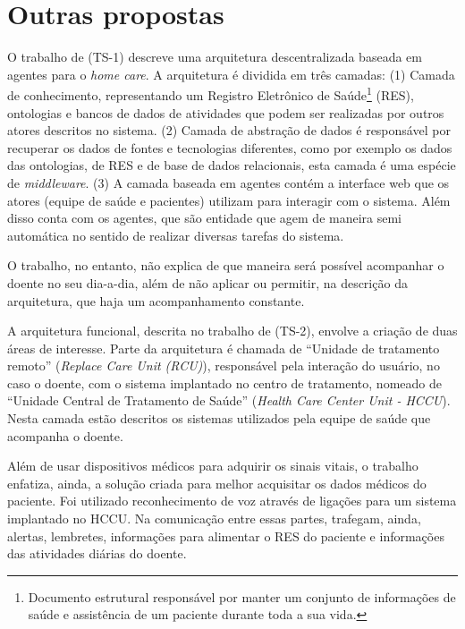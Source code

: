 \section{Outras propostas} \label{sec:solucoes-semelhantes}

O trabalho de  (TS-1) descreve uma arquitetura
descentralizada baseada em agentes para o \textit{home care}. A arquitetura é
dividida em três camadas: (1) Camada de conhecimento, representando um Registro
Eletrônico de Saúde\footnote{Documento estrutural responsável por 
manter um conjunto de informações de saúde e assistência de um paciente durante 
toda a sua vida.} (RES), ontologias e bancos de dados de atividades que podem
ser realizadas por outros atores descritos no sistema. (2) Camada de abstração
de dados é responsável por recuperar os dados de fontes e tecnologias
diferentes, como por exemplo os dados das ontologias, de RES e de base de dados
relacionais, esta camada é uma espécie de \textit{middleware}. (3) A camada
baseada em agentes contém a interface web que os atores (equipe de saúde e
pacientes) utilizam para interagir com o sistema. Além disso conta com os
agentes, que são entidade que agem de maneira semi automática no sentido de
realizar diversas tarefas do sistema. 

O trabalho, no entanto, não explica de que maneira será possível acompanhar o
doente no seu dia-a-dia, além de não aplicar ou permitir, na descrição da
arquitetura, que haja um acompanhamento constante.

A arquitetura funcional, descrita no trabalho de  (TS-2),
envolve a criação de duas áreas de interesse. Parte da arquitetura é chamada de
``Unidade de tratamento remoto'' (\textit{Replace Care Unit (RCU)}), responsável
pela interação do usuário, no caso o doente, com o sistema implantado no centro
de tratamento, nomeado de ``Unidade Central de Tratamento de Saúde''
(\textit{Health Care Center Unit - HCCU}). Nesta camada estão descritos os
sistemas utilizados pela equipe de saúde que acompanha o doente.

Além de usar dispositivos médicos para adquirir os sinais vitais, o trabalho
enfatiza, ainda, a solução criada para melhor acquisitar os dados médicos do
paciente. Foi utilizado reconhecimento de voz através de ligações para um
sistema implantado no HCCU. Na comunicação entre essas partes, trafegam, ainda,
alertas, lembretes, informações para alimentar o RES do paciente e informações
das atividades diárias do doente.

